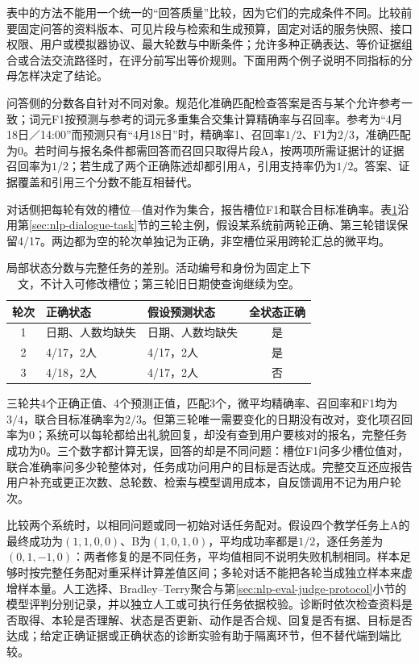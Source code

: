 表中的方法不能用一个统一的“回答质量”比较，因为它们的完成条件不同。比较前要固定问答的资料版本、可见片段与检索和生成预算，固定对话的服务快照、接口权限、用户或模拟器协议、最大轮数与中断条件；允许多种正确表达、等价证据组合或合法交流路径时，在评分前写出等价规则。下面用两个例子说明不同指标的分母怎样决定了结论。

问答侧的分数各自针对不同对象。规范化准确匹配检查答案是否与某个允许参考一致；词元F1按预测与参考的词元多重集合交集计算精确率与召回率。参考为“4月18日／14:00”而预测只有“4月18日”时，精确率1、召回率$1/2$、F1为$2/3$，准确匹配为0。若时间与报名条件都需回答而召回只取得片段A，按两项所需证据计的证据召回率为$1/2$；若生成了两个正确陈述却都引用A，引用支持率仍为$1/2$。答案、证据覆盖和引用三个分数不能互相替代。

对话侧把每轮有效的槽位—值对作为集合，报告槽位F1和联合目标准确率。表\ref{tab:nlp-dialogue-metrics}沿用第\ref{sec:nlp-dialogue-task}节的三轮主例，假设某系统前两轮正确、第三轮错误保留4/17。两边都为空的轮次单独记为正确，非空槽位采用跨轮汇总的微平均。

\begin{table}[htbp]
\centering
\begin{tabular}{cllc}
\toprule
轮次 & 正确状态 & 假设预测状态 & 全状态正确\\
\midrule
1 & 日期、人数均缺失 & 日期、人数均缺失 & 是\\
2 & 4/17，2人 & 4/17，2人 & 是\\
3 & 4/18，2人 & 4/17，2人 & 否\\
\bottomrule
\end{tabular}
\caption{局部状态分数与完整任务的差别。活动编号和身份为固定上下文，不计入可修改槽位；第三轮旧日期使查询继续为空。}
\label{tab:nlp-dialogue-metrics}
\end{table}

三轮共4个正确正值、4个预测正值，匹配3个，微平均精确率、召回率和F1均为$3/4$，联合目标准确率为$2/3$。但第三轮唯一需要变化的日期没有改对，变化项召回率为0；系统可以每轮都给出礼貌回复，却没有查到用户要核对的报名，完整任务成功为0。三个数字都计算无误，回答的却是不同问题：槽位F1问多少槽位值对，联合准确率问多少轮整体对，任务成功问用户的目标是否达成。完整交互还应报告用户补充或更正次数、总轮数、检索与模型调用成本，自反馈调用不记为用户轮次。

比较两个系统时，以相同问题或同一初始对话任务配对。假设四个教学任务上A的最终成功为$(1,1,0,0)$、B为$(1,0,1,0)$，平均成功率都是$1/2$，逐任务差为$(0,1,-1,0)$：两者修复的是不同任务，平均值相同不说明失败机制相同。样本足够时按完整任务配对重采样计算差值区间；多轮对话不能把各轮当成独立样本来虚增样本量。人工选择、Bradley--Terry聚合与第\ref{sec:nlp-eval-judge-protocol}小节的模型评判分别记录，并以独立人工或可执行任务依据校验。诊断时依次检查资料是否取得、本轮是否理解、状态是否更新、动作是否合规、回复是否有据、目标是否达成；给定正确证据或正确状态的诊断实验有助于隔离环节，但不替代端到端比较。
